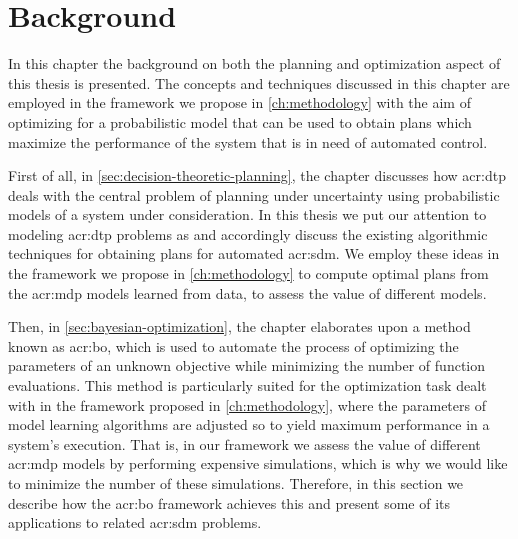 \chapter{Background}
\label{ch:background}

In this chapter the background on both the planning and optimization aspect of this thesis is presented.
The concepts and techniques discussed in this chapter are employed in the framework we propose in \autoref{ch:methodology} with the aim of optimizing for a probabilistic model that can be used to obtain plans which maximize the performance of the system that is in need of automated control.

First of all, in \autoref{sec:decision-theoretic-planning}, the chapter discusses how \acrfull{acr:dtp} deals with the central problem of planning under uncertainty using probabilistic models of a system under consideration.
In this thesis we put our attention to modeling \acrshort{acr:dtp} problems as  and accordingly discuss the existing algorithmic techniques for obtaining plans for automated \acrfull{acr:sdm}.
We employ these ideas in the framework we propose in \autoref{ch:methodology} to compute optimal plans from the \acrshort{acr:mdp} models learned from data, to assess the value of different models.

Then, in \autoref{sec:bayesian-optimization}, the chapter elaborates upon a method known as \acrfull{acr:bo}, which is used to automate the process of optimizing the parameters of an unknown objective while minimizing the number of function evaluations.
This method is particularly suited for the optimization task dealt with in the framework proposed in \autoref{ch:methodology}, where the parameters of model learning algorithms are adjusted so to yield maximum performance in a system's execution.
That is, in our framework we assess the value of different \acrshort{acr:mdp} models by performing expensive simulations, which is why we would like to minimize the number of these simulations.
Therefore, in this section we describe how the \acrshort{acr:bo} framework achieves this and present some of its applications to related \acrshort{acr:sdm} problems.




\newpage


